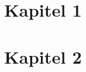 \documentclass[10.5pt]{article}
\begin{document}

    \newpage



    \section{Kapitel 1}
    \lipsum[10]


    \section{Kapitel 2}
\end{document}
